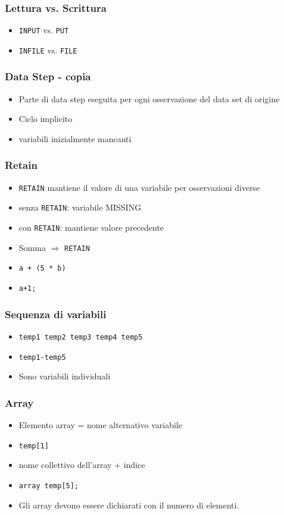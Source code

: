 \begin{frame}[containsverbatim]\frametitle{Lettura vs. Scrittura}
  \begin{itemize}
  \item
    \verb+INPUT+ vs. \verb!PUT!
  \item
    \verb!INFILE! vs. \verb!FILE!
  \end{itemize}\end{frame}



\begin{frame}[fragile]\frametitle{Data Step - copia }
  \begin{itemize}
  \item
    Parte di data step eseguita per ogni osservazione del data set di origine
  \item
    Ciclo implicito
  \item variabili inizialmente mancanti
  \end{itemize}
\end{frame}

\begin{frame}[fragile]\frametitle{Retain}
  \begin{itemize}
  \item
    \verb+RETAIN+ mantiene il valore di una variabile per osservazioni diverse
  \item
    senza \verb+RETAIN+: variabile MISSING
  \item
    con \verb+RETAIN+: mantiene valore precedente
  \item
    Somma $\Rightarrow$ \verb+RETAIN+
  \item
    \verb!a + (5 * b)!
  \item
    \verb!a+1;!
  \end{itemize}
\end{frame}




\begin{frame}[containsverbatim]\frametitle{Sequenza di variabili}
  \begin{itemize}
  \item
    \verb!temp1 temp2 temp3 temp4 temp5!
  \item
    \verb!temp1-temp5!
  \item
    Sono variabili individuali
  \end{itemize}\end{frame}


\begin{frame}[containsverbatim]\frametitle{Array}
  \begin{itemize}
  \item
    Elemento array = nome alternativo variabile
  \item
    \verb!temp[1]!
  \item
    nome collettivo dell'array + indice
  \item
    \verb!array temp[5];!
  \item
    Gli array devono essere \alert{dichiarati} con il numero di elementi.
  \end{itemize}\end{frame}


